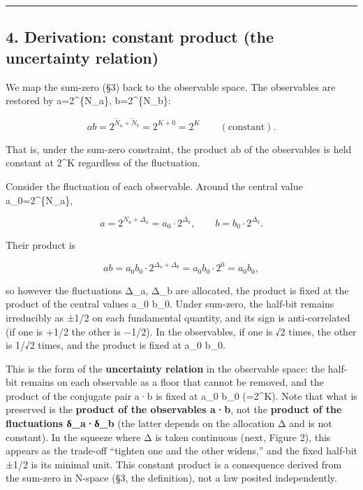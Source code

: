 \documentclass[11pt]{ltjsarticle}
\begin{document}
\begin{center}\rule{0.5\linewidth}{0.5pt}\end{center}

\subsection{4. Derivation: constant product (the uncertainty
relation)}\label{derivation-constant-product-the-uncertainty-relation}

We map the sum-zero (§3) back to the observable space. The observables
are restored by a=2\^{}\{\tilde N\_a\}, b=2\^{}\{\tilde N\_b\}:

\[ab = 2^{\tilde N_a + \tilde N_b} = 2^{K + 0} = 2^{K} \qquad (\text{constant}).\]

That is, under the sum-zero constraint, the product ab of the
observables is held constant at 2\^{}K regardless of the fluctuation.

Consider the fluctuation of each observable. Around the central value
a\_0=2\^{}\{N\_a\},

\[a = 2^{N_a + \Delta_a} = a_0\cdot 2^{\Delta_a}, \qquad b = b_0\cdot 2^{\Delta_b}.\]

Their product is

\[ab = a_0 b_0 \cdot 2^{\Delta_a + \Delta_b} = a_0 b_0 \cdot 2^{0} = a_0 b_0,\]

so however the fluctuations Δ\_a, Δ\_b are allocated, the product is
fixed at the product of the central values a\_0 b\_0. Under sum-zero,
the half-bit remains irreducibly as ±1/2 on each fundamental quantity,
and its sign is anti-correlated (if one is +1/2 the other is −1/2). In
the observables, if one is √2 times, the other is 1/√2 times, and the
product is fixed at a\_0 b\_0.

This is the form of the \textbf{uncertainty relation} in the observable
space: the half-bit remains on each observable as a floor that cannot be
removed, and the product of the conjugate pair a·b is fixed at a\_0 b\_0
(=2\^{}K). Note that what is preserved is the \textbf{product of the
observables a·b}, not the \textbf{product of the fluctuations δ\_a·δ\_b}
(the latter depends on the allocation Δ and is not constant). In the
squeeze where Δ is taken continuous (next, Figure 2), this appears as
the trade-off ``tighten one and the other widens,'' and the fixed
half-bit ±1/2 is its minimal unit. This constant product is a
consequence derived from the sum-zero in N-space (§3, the definition),
not a law posited independently.
\end{document}
